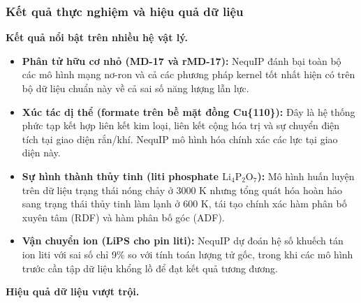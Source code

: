 \subsubsection{Kết quả thực nghiệm và hiệu quả dữ liệu}

\textbf{Kết quả nổi bật trên nhiều hệ vật lý.}

\begin{itemize}
    \item \textbf{Phân tử hữu cơ nhỏ (MD-17 và rMD-17):} NequIP đánh bại toàn bộ các mô hình mạng nơ-ron và cả các phương pháp kernel tốt nhất hiện có trên bộ dữ liệu chuẩn này về cả sai số năng lượng lẫn lực.
    \item \textbf{Xúc tác dị thể (formate trên bề mặt đồng Cu\{110\}):} Đây là hệ thống phức tạp kết hợp liên kết kim loại, liên kết cộng hóa trị và sự chuyển điện tích tại giao diện rắn/khí. NequIP mô hình hóa chính xác các lực tại giao diện này.
    \item \textbf{Sự hình thành thủy tinh (liti phosphate $\text{Li}_4\text{P}_2\text{O}_7$):} Mô hình huấn luyện trên dữ liệu trạng thái nóng chảy ở 3000 K nhưng tổng quát hóa hoàn hảo sang trạng thái thủy tinh làm lạnh ở 600 K, tái tạo chính xác hàm phân bố xuyên tâm (RDF) và hàm phân bố góc (ADF).
    \item \textbf{Vận chuyển ion (LiPS cho pin liti):} NequIP dự đoán hệ số khuếch tán ion liti với sai số chỉ 9\% so với tính toán lượng tử gốc, trong khi các mô hình trước cần tập dữ liệu khổng lồ để đạt kết quả tương đương.
\end{itemize}

\textbf{Hiệu quả dữ liệu vượt trội.}

